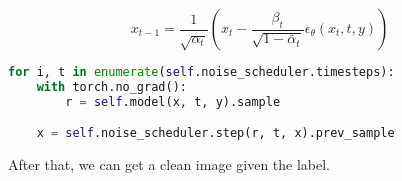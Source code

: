 \begin{equation}
    x_{t-1} = \frac{1}{\sqrt{\alpha_t}} \left( x_t - \frac{\beta_t}{\sqrt{1-\bar{\alpha}_t}} \epsilon_\theta(x_t, t, y) \right)
\end{equation}

\begin{lstlisting}[language=Python]
for i, t in enumerate(self.noise_scheduler.timesteps):
    with torch.no_grad():
        r = self.model(x, t, y).sample

    x = self.noise_scheduler.step(r, t, x).prev_sample
\end{lstlisting}

After that, we can get a clean image given the label.
